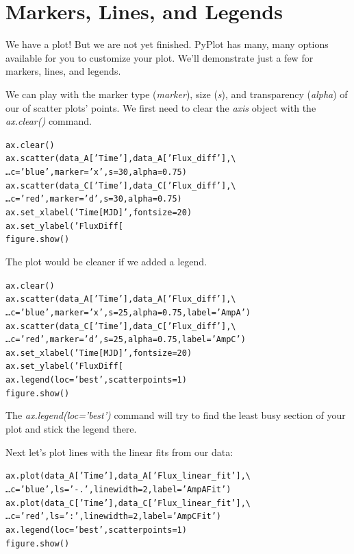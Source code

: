 \section{Markers, Lines, and Legends}  %

We have a plot! But we are not yet finished.
PyPlot has many, many options available for you to customize
your plot. We'll demonstrate just a few for markers, lines, and legends. 

We can play with the marker type (\textit{marker}), size (\textit{s}), and 
transparency (\textit{alpha}) of our of scatter plots' points. We first
need to clear the  \textit{axis} object with the \textit{ax.clear()} command.

\begin{alltt}
\pytab ax.clear()
\pytab ax.scatter(data_A['Time'], data_A['Flux_diff'], \textbackslash 
\ldots   c='blue', marker='x', s=30, alpha=0.75)
\pytab ax.scatter(data_C['Time'], data_C['Flux_diff'], \textbackslash 
\ldots   c='red', marker='d', s=30, alpha=0.75)
\pytab ax.set_xlabel('Time [MJD]', fontsize=20)
\pytab ax.set_ylabel('Flux Diff [%
\pytab figure.show()
\end{alltt}

The plot would be cleaner if we added a legend.

\begin{alltt}
\pytab ax.clear()
\pytab ax.scatter(data_A['Time'], data_A['Flux_diff'], \textbackslash 
\ldots   c='blue', marker='x', s=25, alpha=0.75, label='Amp A')
\pytab ax.scatter(data_C['Time'], data_C['Flux_diff'], \textbackslash 
\ldots   c='red', marker='d', s=25, alpha=0.75, label='Amp C')
\pytab ax.set_xlabel('Time [MJD]', fontsize=20)
\pytab ax.set_ylabel('Flux Diff [%
\pytab ax.legend(loc='best', scatterpoints=1)
\pytab figure.show()
\end{alltt}

The \textit{ax.legend(loc='best')} command will try to find the least busy section 
of your plot and stick the legend there. 

Next let's plot lines with the linear fits from our data:

\begin{alltt}
\pytab ax.plot(data_A['Time'], data_A['Flux_linear_fit'], \textbackslash 
\ldots  c='blue', ls='-.', linewidth=2, label='Amp A Fit')
\pytab ax.plot(data_C['Time'], data_C['Flux_linear_fit'], \textbackslash 
\ldots  c='red', ls=':', linewidth=2, label='Amp C Fit')
\pytab ax.legend(loc='best', scatterpoints=1)
\pytab figure.show()
\end{alltt}

